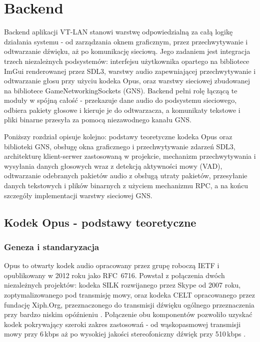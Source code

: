 \chapter{Backend}
\label{chapt:Backend}

Backend aplikacji VT-LAN stanowi warstwę odpowiedzialną za całą logikę działania systemu
- od zarządzania oknem graficznym, przez przechwytywanie i odtwarzanie dźwięku,
aż po komunikację sieciową. Jego zadaniem jest integracja trzech niezależnych
podsystemów: interfejsu użytkownika opartego na bibliotece ImGui renderowanej przez SDL3,
warstwy audio zapewniającej przechwytywanie i odtwarzanie głosu przy użyciu kodeka Opus,
oraz warstwy sieciowej zbudowanej na bibliotece GameNetworkingSockets (GNS). Backend
pełni rolę łączącą te moduły w spójną całość - przekazuje dane audio do podsystemu
sieciowego, odbiera pakiety głosowe i kieruje je do odtwarzacza, a komunikaty tekstowe
i pliki binarne przesyła za pomocą niezawodnego kanału GNS.

Poniższy rozdział opisuje kolejno: podstawy teoretyczne kodeka Opus oraz biblioteki GNS,
obsługę okna graficznego i przechwytywanie zdarzeń SDL3, architekturę klient-serwer
zastosowaną w projekcie, mechanizm przechwytywania i wysyłania danych głosowych wraz
z detekcją aktywności mowy (VAD), odtwarzanie odebranych pakietów audio z obsługą utraty
pakietów, przesyłanie danych tekstowych i plików binarnych z użyciem mechanizmu RPC,
a na końcu szczegóły implementacji warstwy sieciowej GNS.
\section{Kodek Opus - podstawy teoretyczne}
\label{sec:opus_theory}

\subsection*{Geneza i standaryzacja}

Opus \cite{OpusRFC} to otwarty kodek audio opracowany przez grupę roboczą
IETF i opublikowany w 2012 roku jako RFC~6716. Powstał z połączenia dwóch
niezależnych projektów: kodeka SILK rozwijanego przez Skype od 2007 roku,
zoptymalizowanego pod transmisję mowy, oraz kodeka CELT opracowanego przez
fundację Xiph.Org, przeznaczonego do transmisji dźwięku ogólnego przeznaczenia
przy bardzo niskim opóźnieniu \cite{OpusAbout}. Połączenie obu komponentów
pozwoliło uzyskać kodek pokrywający szeroki zakres zastosowań - od wąskopasmowej
transmisji mowy przy 6\,kbps aż po wysokiej jakości stereofoniczny dźwięk
przy 510\,kbps \cite{OpusRFC}.


